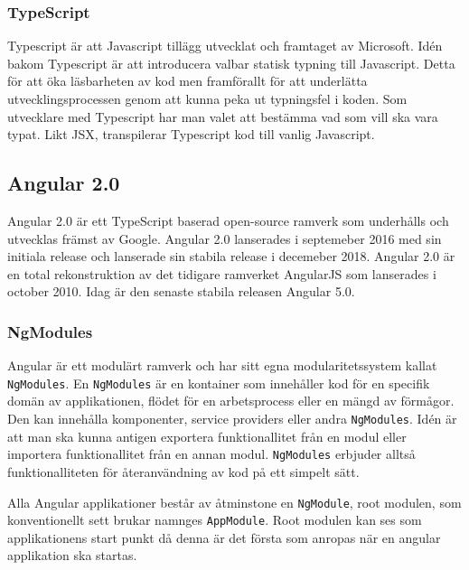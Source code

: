
\subsubsection{TypeScript}
Typescript är att Javascript tillägg utvecklat och framtaget av Microsoft. Idén bakom Typescript är att introducera valbar statisk typning till Javascript. \cite{typescript} Detta för att öka läsbarheten av kod men framförallt för att underlätta utvecklingsprocessen genom att kunna peka ut typningsfel i koden. Som utvecklare med Typescript har man valet att bestämma vad som vill ska vara typat. Likt JSX, transpilerar Typescript kod till vanlig Javascript. \cite{typescript-book}


\subsection{Angular 2.0}
Angular 2.0 är ett TypeScript baserad open-source ramverk som underhålls och utvecklas främst av Google. Angular 2.0 lanserades i septemeber 2016 med sin initiala release och lanserade sin stabila release i decemeber 2018. Angular 2.0 är en total rekonstruktion av det tidigare ramverket AngularJS som lanserades i october 2010. Idag är den senaste stabila releasen Angular 5.0. \cite{angular-date}

\subsubsection{NgModules}
Angular är ett modulärt ramverk och har sitt egna modularitetssystem kallat \texttt{NgModules}.\cite{angular-architecture} En \texttt{NgModules} är en kontainer som innehåller kod för en specifik domän av applikationen, flödet för en arbetsprocess eller en mängd av förmågor. Den kan innehålla komponenter, service providers eller andra \texttt{NgModules}. Idén är att man ska kunna antigen exportera funktionallitet från en modul eller importera funktionallitet från en annan modul. \texttt{NgModules} erbjuder alltså funktionalliteten för återanvändning av kod på ett simpelt sätt. 

Alla Angular applikationer består av åtminstone en \texttt{NgModule}, root modulen, som konventionellt sett brukar namnges \texttt{AppModule}.\cite{angular-modules} Root modulen kan ses som applikationens start punkt då denna är det första som anropas när en angular applikation ska startas.

